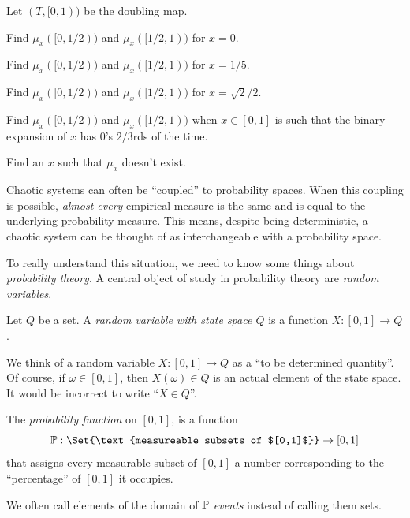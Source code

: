 	\question
	Let $(T,[0,1))$ be the doubling map.
	\begin{parts}
		\item Find $\mu_x([0,1/2))$ and $\mu_x([1/2,1))$ for $x=0$.
		\item Find $\mu_x([0,1/2))$ and $\mu_x([1/2,1))$ for $x=1/5$.
		\item Find $\mu_x([0,1/2))$ and $\mu_x([1/2,1))$ for $x=\sqrt{2}/2$.
		\item Find $\mu_x([0,1/2))$ and $\mu_x([1/2,1))$ when $x\in[0,1]$ is such that the binary expansion
			of $x$ has $0$'s $2/3$rds of the time.
		\item Find an $x$ such that $\mu_x$ doesn't exist.
	\end{parts}

	\newpage
	Chaotic systems can often be ``coupled'' to probability spaces. When this coupling is possible,
	\emph{almost every} empirical measure is the same and is equal to the underlying probability measure.
	This means, despite being deterministic, a chaotic system can be thought of as interchangeable with a
	probability space.



	\newpage
	To really understand this situation, we need to know some things about \emph{probability theory}.
	A central object of study in probability theory are \emph{random variables}.

	\begin{definition}
		Let $Q$ be a set. A \emph{random variable with state space $Q$} is a function $X:[0,1]\to Q$.
	\end{definition}

	We think of a random variable $X:[0,1]\to Q$ as a ``to be determined quantity''. Of course, if $\omega\in [0,1]$, then
	$X(\omega)\in Q$ is an actual element of the state space. It would be incorrect to write ``$X\in Q$''.

	\begin{definition}
		The \emph{probability function} on $[0,1]$, is a function
		\[
			\P:\Set{\text{measureable subsets of $[0,1]$}}\to[0,1]
		\]
		that assigns every measurable subset of $[0,1]$ a number corresponding to
		the ``percentage'' of $[0,1]$ it occupies.
	\end{definition}

	We often call elements of the domain of $\P$ \emph{events} instead of calling them sets.

